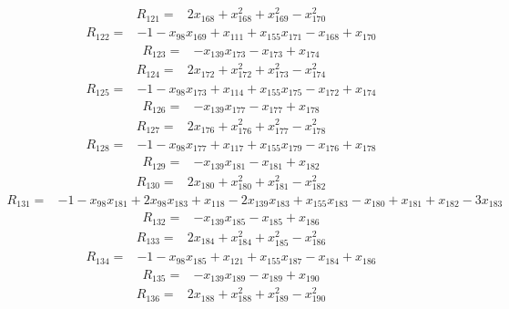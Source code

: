 \begin{align*}
 R_{121}={}&2x_{168} +x_{168}^{2} +x_{169}^{2} -x_{170}^{2}
\end{align*}
\begin{align*}
 R_{122}={}&-1 -x_{98}x_{169} +x_{111} +x_{155}x_{171} -x_{168} +x_{170}
\end{align*}
\begin{align*}
 R_{123}={}&-x_{139}x_{173} -x_{173} +x_{174}
\end{align*}
\begin{align*}
 R_{124}={}&2x_{172} +x_{172}^{2} +x_{173}^{2} -x_{174}^{2}
\end{align*}
\begin{align*}
 R_{125}={}&-1 -x_{98}x_{173} +x_{114} +x_{155}x_{175} -x_{172} +x_{174}
\end{align*}
\begin{align*}
 R_{126}={}&-x_{139}x_{177} -x_{177} +x_{178}
\end{align*}
\begin{align*}
 R_{127}={}&2x_{176} +x_{176}^{2} +x_{177}^{2} -x_{178}^{2}
\end{align*}
\begin{align*}
 R_{128}={}&-1 -x_{98}x_{177} +x_{117} +x_{155}x_{179} -x_{176} +x_{178}
\end{align*}
\begin{align*}
 R_{129}={}&-x_{139}x_{181} -x_{181} +x_{182}
\end{align*}
\begin{align*}
 R_{130}={}&2x_{180} +x_{180}^{2} +x_{181}^{2} -x_{182}^{2}
\end{align*}
\begin{align*}
 R_{131}={}&-1 -x_{98}x_{181} +2x_{98}x_{183} +x_{118} -2x_{139}x_{183} +x_{155}x_{183} -x_{180} +x_{181} +x_{182} -3x_{183}
\end{align*}
\begin{align*}
 R_{132}={}&-x_{139}x_{185} -x_{185} +x_{186}
\end{align*}
\begin{align*}
 R_{133}={}&2x_{184} +x_{184}^{2} +x_{185}^{2} -x_{186}^{2}
\end{align*}
\begin{align*}
 R_{134}={}&-1 -x_{98}x_{185} +x_{121} +x_{155}x_{187} -x_{184} +x_{186}
\end{align*}
\begin{align*}
 R_{135}={}&-x_{139}x_{189} -x_{189} +x_{190}
\end{align*}
\begin{align*}
 R_{136}={}&2x_{188} +x_{188}^{2} +x_{189}^{2} -x_{190}^{2}
\end{align*}
